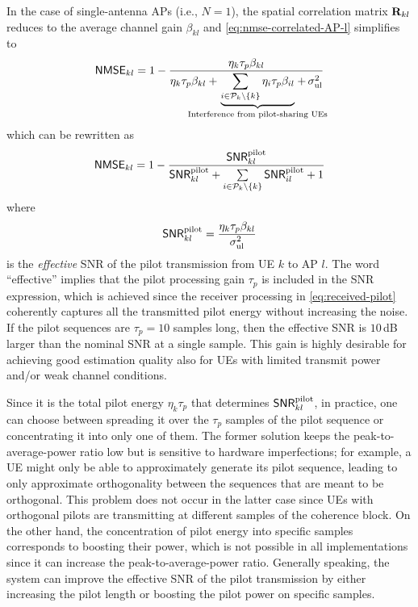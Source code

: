 In the case of single-antenna APs (i.e., $N=1$), the spatial correlation matrix $\mathbf{R}_{kl}$ reduces to the average channel gain $\beta_{kl}$ and \eqref{eq:nmse-correlated-AP-l} simplifies to 
\begin{align}
\mathacr{NMSE}_{kl}=1 - \frac{\eta_k \tau_p \beta_{kl}}{ \eta_k \tau_p \beta_{kl} + \hspace{-1cm}\underbrace{\sum_{i \in \mathcal{P}_k\setminus \{k \} }\eta_i \tau_p \beta_{il}}_{\text{Interference from pilot-sharing UEs}} \hspace{-1cm} + \,\sigmaUL} \label{eq:nmse-uncorrelated-AP-l}
\end{align}
which can be rewritten as
\begin{align}
\mathsf{NMSE}_{kl}=1 - \frac{\mathsf{SNR}_{kl}^{\text{pilot}}}{ \mathsf{SNR}_{kl}^{\text{pilot}} +\sum\limits_{i \in \mathcal{P}_k\setminus \{ k \}}\mathsf{SNR}_{il}^{\text{pilot}}  + 1} \label{eq:nmse-uncorrelated-AP-l-1}
\end{align}
where 
\begin{align}
\mathsf{SNR}_{kl}^{\text{pilot}}= \frac{\eta_k\tau_p \beta_{kl}}{\sigma^2_{\mathrm{ul}}} \label{eq:effective-pilot-SNR}
\end{align}
is the \emph{effective} SNR of the pilot transmission from UE $k$ to AP $l$. The word ``effective'' implies that the pilot processing gain $\tau_p$ is included in the SNR expression, which is achieved since the receiver processing in \eqref{eq:received-pilot} coherently captures all the transmitted pilot energy without increasing the noise. If the pilot sequences are $\tau_p = 10$ samples long, then the effective SNR is $10$\,dB larger than the nominal SNR at a single sample. This gain is highly desirable for achieving good estimation quality also for UEs with limited transmit power and/or weak channel conditions.

Since it is the total pilot energy $\eta_k\tau_p$ that determines $\mathsf{SNR}_{kl}^{\text{pilot}}$, in practice, one can choose between spreading it over the $\tau_p$ samples of the pilot sequence or concentrating it into only one of them. The former solution keeps the peak-to-average-power ratio low but is sensitive to hardware imperfections; for example, a UE might only be able to approximately generate its pilot sequence, leading to only approximate orthogonality between the sequences that are meant to be orthogonal. This problem does not occur in the latter case since UEs with orthogonal pilots are transmitting at different samples of the coherence block. On the other hand, the concentration of pilot energy into specific samples corresponds to boosting their power, which is not possible in all implementations since it can increase the peak-to-average-power ratio. Generally speaking, the system can improve the effective SNR of the pilot transmission by either increasing the pilot length or boosting the pilot power on specific samples.


